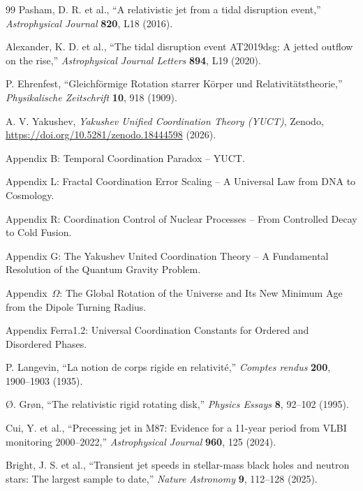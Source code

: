 \documentclass[12pt,a4paper]{article}
\begin{document}
\begin{thebibliography}{99}
		Pasham, D. R. et al., ``A relativistic jet from a tidal disruption event,'' \emph{Astrophysical Journal} \textbf{820}, L18 (2016).
			
		Alexander, K. D. et al., ``The tidal disruption event AT2019dsg: A jetted outflow on the rise,'' \emph{Astrophysical Journal Letters} \textbf{894}, L19 (2020).
		
		P. Ehrenfest, ``Gleichf{\"o}rmige Rotation starrer K{\"o}rper und Relativit{\"a}tstheorie,'' \emph{Physikalische Zeitschrift} \textbf{10}, 918 (1909).
			
		A. V. Yakushev, \emph{Yakushev Unified Coordination Theory (YUCT)}, Zenodo, \url{https://doi.org/10.5281/zenodo.18444598} (2026).
			
		Appendix B: Temporal Coordination Paradox -- YUCT.
			
		Appendix L: Fractal Coordination Error Scaling -- A Universal Law from DNA to Cosmology.
			
		Appendix R: Coordination Control of Nuclear Processes -- From Controlled Decay to Cold Fusion.
			
		Appendix G: The Yakushev United Coordination Theory -- A Fundamental Resolution of the Quantum Gravity Problem.
			
		Appendix~\(\Omega\): The Global Rotation of the Universe and Its New Minimum Age from the Dipole Turning Radius.
			
		Appendix Ferra1.2: Universal Coordination Constants for Ordered and Disordered Phases.
			
		P. Langevin, ``La notion de corps rigide en relativit{\'e},'' \emph{Comptes rendus} \textbf{200}, 1900--1903 (1935).
			
		{\O}. Gr{\o}n, ``The relativistic rigid rotating disk,'' \emph{Physics Essays} \textbf{8}, 92--102 (1995).
			
		Cui, Y. et al., ``Precessing jet in M87: Evidence for a 11-year period from VLBI monitoring 2000–2022,'' \emph{Astrophysical Journal} \textbf{960}, 125 (2024).
			
		Bright, J. S. et al., ``Transient jet speeds in stellar-mass black holes and neutron stars: The largest sample to date,'' \emph{Nature Astronomy} \textbf{9}, 112–128 (2025).
			

\end{thebibliography}
\end{document}
